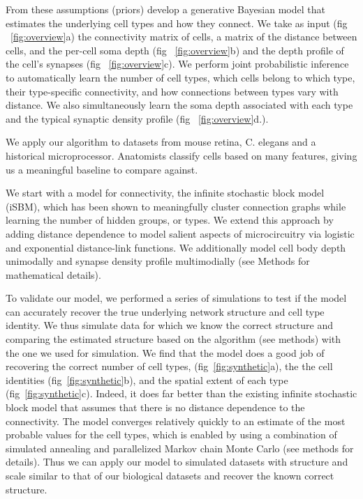 \documentclass{article}
\begin{document}
From these assumptions (priors) develop a generative Bayesian model
that estimates the underlying cell types and how they connect. We take
as input (fig ~\ref{fig:overview}a) the connectivity matrix of cells,
a matrix of the distance between cells, and the per-cell soma depth
(fig ~\ref{fig:overview}b) and the depth profile of the cell's
synapses (fig ~\ref{fig:overview}c). We perform joint probabilistic
inference to automatically learn the number of cell types, which cells
belong to which type, their type-specific connectivity, and how
connections between types vary with distance. We also simultaneously
learn the soma depth associated with each type and the typical
synaptic density profile (fig ~\ref{fig:overview}d.).

We apply our algorithm to datasets from mouse
retina, C. elegans and a historical microprocessor. Anatomists
classify cells based on many features, giving us a meaningful baseline
to compare against.

We start with a model for connectivity, the infinite stochastic block
model (iSBM)\autocite{Kemp2006a,Xu2006}, which has been shown to
meaningfully cluster connection graphs while learning the number of
hidden groups, or types. We extend this approach by adding distance
dependence to model salient aspects of microcircuitry via logistic and
exponential distance-link functions.  We additionally model cell body
depth unimodally and synapse density profile multimodially (see
Methods for mathematical details).

To validate our model, we performed a series of simulations to test if
the model can accurately recover the true underlying network structure
and cell type identity.  We thus simulate data for which we know the
correct structure and comparing the estimated structure based on the
algorithm (see methods) with the one we used for simulation. We find
that the model does a good job of recovering the correct number of
cell types, (fig~\ref{fig:synthetic}a), the the cell identities
(fig~\ref{fig:synthetic}b), and the spatial extent of each type
(fig~\ref{fig:synthetic}c).  Indeed, it does far better than the
existing infinite stochastic block model that assumes that there is no
distance dependence to the connectivity. The model converges
relatively quickly to an estimate of the most probable values for the
cell types, which is enabled by using a combination of simulated
annealing and parallelized Markov chain Monte Carlo (see methods for
details). Thus we can apply our model to simulated datasets with structure
and scale similar to that of our biological datasets and recover the known 
correct structure. 
\end{document}
